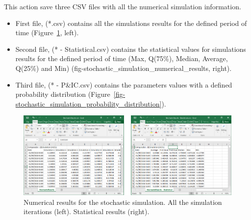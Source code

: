 \documentclass[
  letterpaper,
  DIV=11,
  numbers=noendperiod]{scrreprt}
\begin{document}
This action save three CSV files with all the numerical simulation
information.

\begin{itemize}
\item
  {First file, (*.csv) contains all the simulations results for the
  defined period of time
  (Figure~\ref{fig-stochastic_simulation_numerical_results}, left).}
\item
  {Second file, (* - Statistical.csv) contains the statistical values
  for simulations results for the defined period of time (Max, Q(75\%),
  Median, Average, Q(25\%) and Min)
  (fig-stochastic\_simulation\_numerical\_results, right).}
\item
  {Third file, (* - P\&IC.csv) contains the parameters values with a
  defined probability distribution
  (Figure~\ref{fig-stochastic_simulation_probability_distribution}).}
\end{itemize}

\begin{figure}

{\centering \includegraphics{./figures/fig-stochastic_simulation_numerical_results.png}

}

\caption{\label{fig-stochastic_simulation_numerical_results}Numerical
results for the stochastic simulation. All the simulation iterations
(left). Statistical results (right).}

\end{figure}
\end{document}
